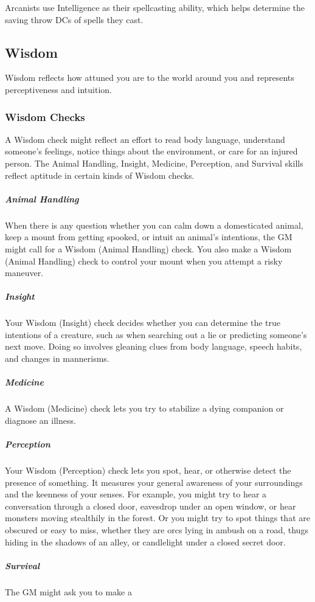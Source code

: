Arcanists use Intelligence as their spellcasting ability, which helps determine the saving throw DCs of spells they cast.

\subsection{Wisdom}

Wisdom reflects how attuned you are to the world around you and represents perceptiveness and intuition.

\subsubsection{Wisdom Checks}

A Wisdom check might reflect an effort to read body language, understand someone's feelings, notice things about the environment, or care for an injured person. The Animal Handling, Insight, Medicine, Perception, and Survival skills reflect aptitude in certain kinds of Wisdom checks.

\subparagraph*{Animal Handling} When there is any question whether you can calm down a domesticated animal, keep a mount from getting spooked, or intuit an animal's intentions, the GM might call for a Wisdom (Animal Handling) check. You also make a Wisdom (Animal Handling) check to control your mount when you attempt a risky maneuver.

\subparagraph*{Insight} Your Wisdom (Insight) check decides whether you can determine the true intentions of a creature, such as when searching out a lie or predicting someone's next move. Doing so involves gleaning clues from body language, speech habits, and changes in mannerisms.

\subparagraph*{Medicine} A Wisdom (Medicine) check lets you try to stabilize a dying companion or diagnose an illness.

\subparagraph*{Perception} Your Wisdom (Perception) check lets you spot, hear, or otherwise detect the presence of something. It measures your general awareness of your surroundings and the keenness of your senses. For example, you might try to hear a conversation through a closed door, eavesdrop under an open window, or hear monsters moving stealthily in the forest. Or you might try to spot things that are obscured or easy to miss, whether they are orcs lying in ambush on a road, thugs hiding in the shadows of an alley, or candlelight under a closed secret door.

\subparagraph*{Survival} The GM might ask you to make a

